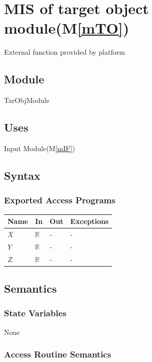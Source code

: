\documentclass[12pt, titlepage]{article}
\newcommand{\mref}[1]{M\ref{#1}}
\begin{document}
\section{MIS of target object module(\mref{mTO})}

External function provided by platform

\subsection{Module}

TarObjModule

\subsection{Uses}

Input Module(\mref{mIF})

\subsection{Syntax}

\subsubsection{Exported Access Programs}

\begin{center}
	\begin{tabular}{p{2cm} p{4cm} p{4cm} p{2cm}}
		\hline
		\textbf{Name} & \textbf{In} & \textbf{Out} & \textbf{Exceptions} \\
		\hline
		$X$ & $\mathbb{R}$ & - & - \\
		$Y$ & $\mathbb{R}$ & - & - \\
		$Z$ & $\mathbb{R}$ & - & - \\
		\hline
	\end{tabular}
\end{center}

\subsection{Semantics}

\subsubsection{State Variables}

None

\subsubsection{Access Routine Semantics}
\end{document}
